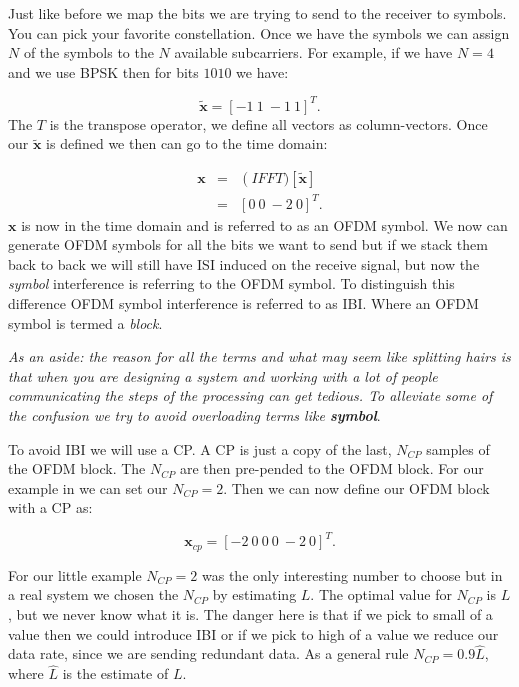 Just like before we map the bits we are trying to send to the receiver to symbols. You can pick your favorite constellation. Once we have the symbols we can assign $N$ of the symbols to the $N$ available subcarriers. For example, if we have $N=4$ and we use \ac{BPSK} then for bits $1010$ we have:

\begin{equation}
\tilde{\mathbf{x}} = [-1~1~-1~1]^T.
\end{equation} 
\noindent
The $T$ is the transpose operator, we define all vectors as column-vectors. Once our $\tilde{\mathbf{x}}$ is defined we then can go to the time domain:

\begin{eqnarray}
\mathbf{x} &=& \operatorname(IFFT)\left[\tilde{\mathbf{x}}\right]\\
&=& [0~0~-2~0]^T.
\label{eq:ofdmtime}
\end{eqnarray}
\noindent
$\mathbf{x}$ is now in the time domain and is referred to as an \ac{OFDM} symbol. We now can generate \ac{OFDM} symbols for all the bits we want to send but if we stack them back to back we will still have \ac{ISI} induced on the receive signal, but now the \emph{symbol} interference is referring to the \ac{OFDM} symbol. To distinguish this difference \ac{OFDM} symbol interference is referred to as \ac{IBI}. Where an \ac{OFDM} symbol is termed a \emph{block}.

\emph{As an aside: the reason for all the terms and what may seem like splitting hairs is that when you are designing a system and working with a lot of people communicating the steps of the processing can get tedious. To alleviate some of the confusion we try to avoid overloading terms like \bf{symbol}}.

To avoid \ac{IBI} we will use a \ac{CP}. A \ac{CP} is just a copy of the last, $N_{CP}$ samples of the \ac{OFDM} block. The $N_{CP}$ are then pre-pended to the \ac{OFDM} block. For our example in  we can set our $N_{CP}=2$. Then we can now define our \ac{OFDM} block with a \ac{CP} as:

\begin{equation}
\mathbf{x}_{cp}= [-2~0~0~0~-2~0]^T.
\end{equation}

For our little example $N_{CP}=2$ was the only interesting number to choose but in a real system we chosen the $N_{CP}$ by estimating $L$. The optimal value for $N_{CP}$ is $L$, but we never know what it is. The danger here is that if we pick to small of a value then we could introduce \ac{IBI} or if we pick to high of a value we reduce our data rate, since we are sending redundant data. As a general rule $N_{CP}=0.9\hat{L}$, where $\hat{L}$ is the estimate of $L$.

